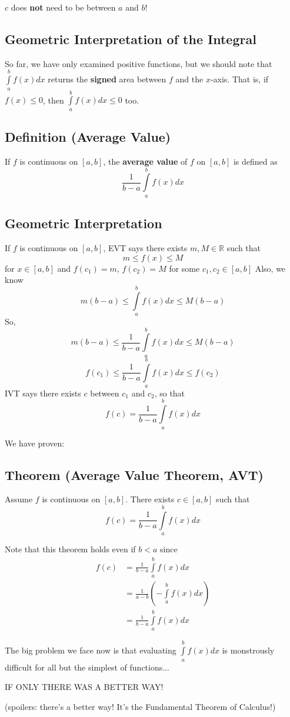 \begin{remark}
    $ c $ does \textbf{not} need to be between $ a $ and $ b $!
\end{remark}

\subsection{Geometric Interpretation of the Integral}
So far, we have only examined positive functions, but we should note that $ \int\limits_{a}^{b} f(x)dx $ 
returns the \textbf{signed} area between $ f $ and the $ x $-axis. That is, if $ f(x)\le 0 $, then
$ \int\limits_{a}^{b} f(x)dx\le 0 $ too.

\subsection{Definition (Average Value)}
If $ f $ is continuous on $ [a,b] $, the \textbf{average value} of $ f $ on $ [a,b] $ is defined as
\[ \frac{1}{b-a} \int\limits_{a}^{b} f(x)dx \]

\subsection{Geometric Interpretation}
If $ f $ is continuous on $ [a,b] $, EVT says there exists $ m,M\in\mathbb{R} $ such that
\[m\le f(x) \le M\]
for $ x\in[a,b] $ and $ f(c_1)=m $, $ f(c_2)=M $ for some $ c_1,c_2\in[a,b] $ 
Also, we know \[ m(b-a)\le \int\limits_{a}^{b} f(x) d{x} \le M(b-a) \]
So,
\[ m(b-a)\le \frac{1}{b-a} \int\limits_{a}^{b} f(x) d{x} \le M(b-a) \]
\[ f(c_1)\le \frac{1}{b-a} \int\limits_{a}^{b} f(x) d{x} \le f(c_2) \]
IVT says there exists $ c $ between $ c_1 $ and $ c_2 $, so that
\[ f(c)=\frac{1}{b-a} \int\limits_{a}^{b} f(x) d{x} \]

We have proven:
\subsection{Theorem (Average Value Theorem, AVT)}
Assume $ f $ is continuous on $ [a,b] $. There exists $ c\in[a,b] $ such that
\[ f(c)=\frac{1}{b-a} \int\limits_{a}^{b} f(x) d{x} \]

\begin{remark}
    Note that this theorem holds even if $ b<a $ since
    \begin{align*}
        f(c)&=\frac{1}{b-a} \int\limits_{a}^{b} f(x) d{x}\\
            &=\frac{1}{a-b}\left(-\int\limits_{a}^{b} f(x) d{x}\right)\\
            &=\frac{1}{b-a} \int\limits_{a}^{b} f(x) d{x}
    \end{align*}
\end{remark}

The big problem we face now is that evaluating $ \int\limits_{a}^{b} f(x) d{x} $ is
monstrously difficult for all but the simplest of functions...

IF ONLY THERE WAS A BETTER WAY!

(spoilers: there's a better way! It's the Fundamental Theorem of Calculus!)
